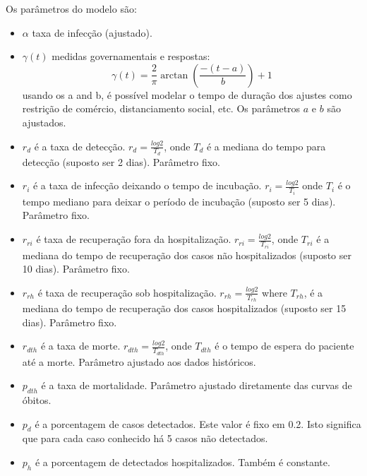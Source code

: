 \documentclass[12pt]{article}
\begin{document}
Os parâmetros do modelo são:
\begin{itemize}
 \item $\alpha$ taxa de infecção (ajustado).
 
 \item $\gamma(t)$ medidas governamentais e respostas:
\[
  \gamma(t) = \frac{2}{\pi} \arctan \left( \frac{-(t - a)}{b}  \right) + 1
\]
usando os  a and b, é possível modelar o tempo de duração dos ajustes como restrição de comércio, distanciamento social, etc. Os parâmetros $a$ e $b$ são ajustados.

\item $r_d$ é a taxa de detecção.   $ r_d = \frac{log 2}{T_d}$,
 onde $T_d$ é a mediana do tempo para detecção (suposto ser 2 dias). Parâmetro fixo.

\item $r_i$ é a taxa de infecção deixando o tempo de incubação. 
  $r_i = \frac{log 2}{T_i}$  onde $T_i$ é o tempo mediano para deixar o período de incubação (suposto ser 5 dias).  Parâmetro fixo.

\item $r_{ri}$ é taxa de recuperação fora da hospitalização. 
   $r_{ri} = \frac{log 2}{T_{ri}}$, onde $T_{ri}$ é a mediana do tempo de recuperação dos casos não hospitalizados (suposto ser 10 dias). Parâmetro fixo.

\item $r_{rh}$ é taxa de recuperação sob hospitalização.
$r_{rh} = \frac{log 2}{T_{rh}}$ where $T_{rh}$, é a mediana do tempo de recuperação dos casos  hospitalizados (suposto ser 15 dias). Parâmetro fixo.

\item $r_{dth}$ é a taxa de morte.
 $r_{dth} = \frac{log 2}{T_{dth}}$, onde $T_{dth}$ é o tempo de espera do paciente até a morte. Parâmetro ajustado aos dados históricos.

\item $p_{dth}$ é a taxa de mortalidade. Parâmetro ajustado diretamente das curvas de óbitos.

\item $p_d$ é a porcentagem de casos detectados. Este valor é fixo em 0.2. Isto significa que para cada caso conhecido há 5 casos não detectados. 

\item $p_h$ é a porcentagem de detectados hospitalizados. Também é constante. 

\end{itemize}
\end{document}
